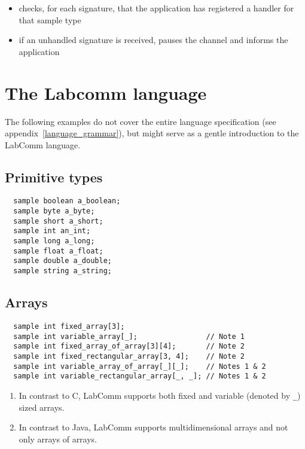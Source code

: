 \documentclass[a4paper]{article}
\begin{document}
\begin{itemize}
 \item checks, for each signature, that the application has registered a handler for that sample type
 \item if an unhandled signature is received, pauses the channel and informs the application
\end{itemize}

\section{The Labcomm language}

The following examples do not cover the entire language
specification (see appendix~\ref{language_grammar}), but might serve as a
gentle introduction to the LabComm language.

\subsection{Primitive types}

\begin{verbatim}
  sample boolean a_boolean;
  sample byte a_byte;
  sample short a_short;
  sample int an_int;
  sample long a_long;
  sample float a_float;
  sample double a_double;
  sample string a_string;
\end{verbatim}

\subsection{Arrays}

\begin{verbatim}
  sample int fixed_array[3];
  sample int variable_array[_];                // Note 1
  sample int fixed_array_of_array[3][4];       // Note 2
  sample int fixed_rectangular_array[3, 4];    // Note 2
  sample int variable_array_of_array[_][_];    // Notes 1 & 2
  sample int variable_rectangular_array[_, _]; // Notes 1 & 2
\end{verbatim}

\begin{enumerate}
\item In contrast to C, LabComm supports both fixed and variable (denoted
by \verb+_+) sized arrays.

\item In contrast to Java, LabComm supports multidimensional arrays and not
only arrays of arrays.

\end{enumerate}
\end{document}
